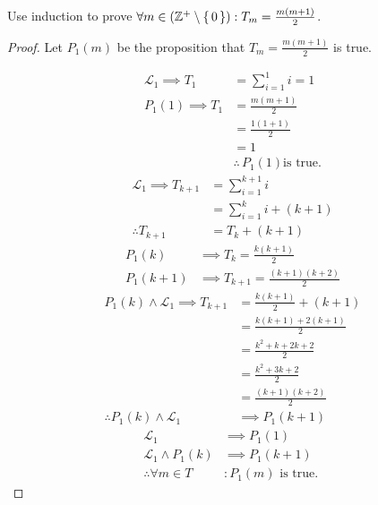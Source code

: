 \begin{question}
	Use induction to prove $\forall m \in ({\mathbb Z}^{+} \setminus \set{0} ) : T_m = \frac{m(m+1)}{2} $.
	\begin{proof}

		Let $P_1(m)$ be the proposition that $T_m = \frac{m(m+1)}{2}$ is true.

		\begin{align*}
			\mathcal L_1 \implies			T_1 & = \sum_{i=1}^{1}i = 1                       \\
			P_1(1) \implies T_1         & = \frac{m(m+1)}{2}                          \\
			                            & = \frac{1(1+1)}{2}                          \\
			                            & = 1                                         \\
			                            & \therefore\,         P_1(1) \text{is true.}
		\end{align*}
		\begin{align*}
			\mathcal L_1 \implies			T_{k+1}  & = \sum_{i=1}^{k+1}i       \\
			                                 & = \sum_{i=1}^{k}i + (k+1) \\
			\therefore															T_{k+1} & = T_k + (k+1)
		\end{align*}
		\begin{align*}
			P_1(k)   & \implies T_k                             = \frac{k(k+1)}{2} \\
			P_1(k+1) & \implies 	T_{k+1}  =\frac{(k+1)(k+2)}{2}
		\end{align*}
		\begin{align*}
			P_1(k) \wedge \mathcal{L}_1 \implies T_{k+1} & = \frac{k(k+1)}{2} + (k+1)   \\
			                                             & = \frac{k(k+1) + 2(k+1)}{2}  \\
			                                             & = \frac{k^2 + k + 2k + 2}{2} \\
			                                             & = \frac{k^2 + 3k + 2}{2}     \\
			                                             & =\frac{(k+1)(k+2)}{2}        \\
			\therefore P_1(k)\wedge \mathcal{L}_1        & \implies P_1(k+1)
		\end{align*}
		\begin{align*}
			\mathcal{L}_1                       & \implies P_1(1)             \\
			\mathcal{L}_1 \wedge		P_1(k)        & \implies P_1(k+1)           \\
			\therefore \forall m          \in T & : P_1(m)  \text{ is true. }
		\end{align*}


	\end{proof}
\end{question}
